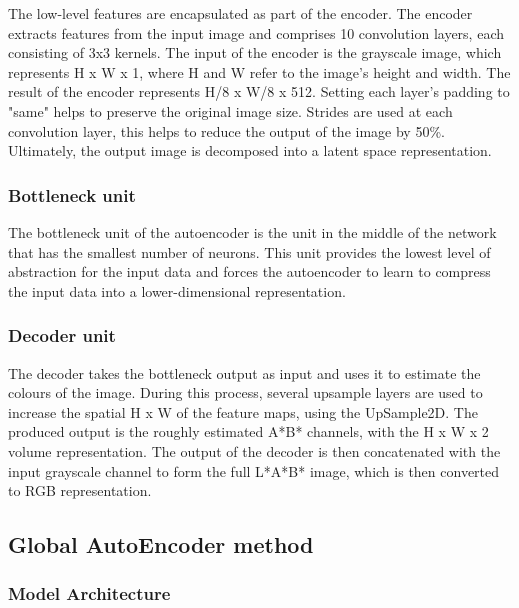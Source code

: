 The low-level features are encapsulated as part of the encoder. The encoder extracts features from the input image and comprises 10 convolution layers, each consisting of 3x3 kernels. The input of the encoder is the grayscale image, which represents H x W x 1, where H and W refer to the image's height and width. The result of the encoder represents H/8 x W/8 x 512. Setting each layer's padding to "same" helps to preserve the original image size. Strides are used at each convolution layer, this helps to reduce the output of the image by 50\%. Ultimately, the output image is decomposed into a latent space representation.

\subsubsection*{Bottleneck unit}
The bottleneck unit of the autoencoder is the unit in the middle of the network that has the smallest number of neurons. This unit provides the lowest level of abstraction for the input data and forces the autoencoder to learn to compress the input data into a lower-dimensional representation.

\subsubsection*{Decoder unit}


The decoder takes the bottleneck output as input and uses it to estimate the colours of the image. During this process, several upsample layers are used to increase the spatial H x W of the feature maps, using the UpSample2D. The produced output is the roughly estimated A*B* channels, with the H x W x 2 volume representation. The output of the decoder is then concatenated with the input grayscale channel to form the full L*A*B* image, which is then converted to RGB representation.
\pagebreak
\subsection{Global AutoEncoder method}

\subsubsection*{Model Architecture}

